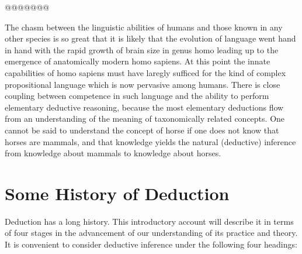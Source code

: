 \documentclass[10pt,titlepage]{book}
\begin{document}
{@@@@@@@

The chasm between the linguistic abilities of humans and those known in any other species is so great that it is likely that the evolution of language went hand in hand with the rapid growth of brain size in genus homo leading up to the emergence of anatomically modern homo sapiens.
At this point the innate capabilities of homo sapiens must have laregly sufficed for the kind of complex propositional language which is now pervasive among humans.
There is close coupling between competence in such language and the ability to perform elementary deductive reasoning, because the most elementary deductions flow from an understanding of the meaning of taxonomically related concepts.
One cannot be said to understand the concept of horse if one does not know that horses are mammals, and that knowledge yields the natural (deductive) inference from knowledge about mammals to knowledge about horses.

}

\section{Some History of Deduction}

Deduction has a long history.
This introductory account will describe it in terms of four stages in the advancement of our understanding of its practice and theory.
It is convenient to consider deductive inference under the following four headings:
\end{document}
